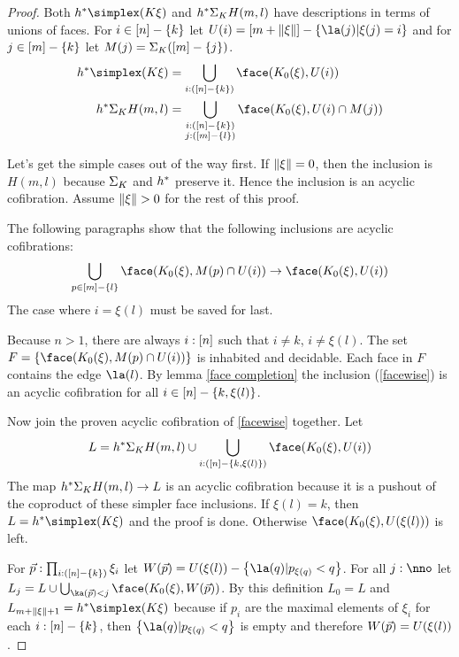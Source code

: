 \begin{proof} 
Both $h\ri\simplex(K\xi)$ and $h^* \Sigma_ K H(m,l)$ have descriptions in terms of unions of faces. For $i\in [n]-\left\{k\right\}$ let $\U(i) = [m+\norm\xi]-\set{\la(j)|\xi(j)=i}$ and for $j\in [m]-\left\{k\right\}$ let $M(j) = \Sigma_ K([m]-\left\{j\right\})$.
\begin{align*}
h\ri\simplex(K\xi) &= \bigcup_{i\of([n]-\set{k})} \face(K_0(\xi),\U(i))\\
h\ri \depsum K H(m,l)&= \bigcup_{\substack{i\of([n]-\set{k})\\j\of([m]-\set l)}} \face(K_0(\xi),\U(i)\cap \A(j))
\end{align*}

Let's get the simple cases out of the way first. If $\Vert \xi \Vert = 0$, then the inclusion is $H(m,l)$ because $\Sigma_ K$ and $h^*$ preserve it. Hence the inclusion is an acyclic cofibration. Assume $\Vert \xi \Vert>0$ for the rest of this proof.

The following paragraphs show that the following inclusions are acyclic cofibrations:
\begin{equation} \bigcup_{p\in[m]-\set l} \face(K_0(\xi),\A(p)\cap\U(i))\to \face(K_0(\xi),\U(i)) \label{facewise} \end{equation}
The case where $i=\xi(l)$ must be saved for last.

Because $n>1$, there are always $i:[n]$ such that $i\neq k$, $i\neq \xi(l)$. The set $F = \set{\face(K_0(\xi),\A(p)\cap\U(i))}$ is inhabited and decidable. Each face in $F$ contains the edge $\la(l)$. By lemma \ref{face completion} the inclusion (\ref{facewise}) is an acyclic cofibration for all $i\in [n]-\left\{k,\xi(l)\right\}$.

Now join the proven acyclic cofibration of \ref{facewise} together. Let
\[ L=h\ri \depsum K H(m,l)\cup\bigcup_{i\of([n]-\set{k,\xi(l)})}\face(K_0(\xi),\U(i)) \]
The map $h^* \Sigma_ K H(m,l)\to L$ is an acyclic cofibration because it is a pushout of the coproduct of these simpler face inclusions. If $\xi(l)=k$, then $L=h\ri \simplex(K\xi)$ and the proof is done. Otherwise $\face(K_0(\xi),\U(\xi(l)))$ is left.

For $\vec p :\prod_{i:([n]-\left\{k\right\})}\xi_i$ let $\W(\vec p) = \U(\xi(l))-\set{ \la(q) | p_{\xi(q)} < q }$. For all $j\of\nno$ let $L_j = L\cup \bigcup_{ \ka(\vec p) < j } \face(K_0(\xi),\W(\vec p))$. By this definition $L_0=L$ and $L_{m+\norm\xi+1} = h\ri\simplex(K\xi)$ because if $p_i$ are the maximal elements of $\xi_i$ for each $i:[n]-\left\{k\right\}$, then $\set{ \la(q) | p_{\xi(q)} < q }$ is empty and therefore $W(\vec p) = U(\xi(l))$.


\end{proof}
